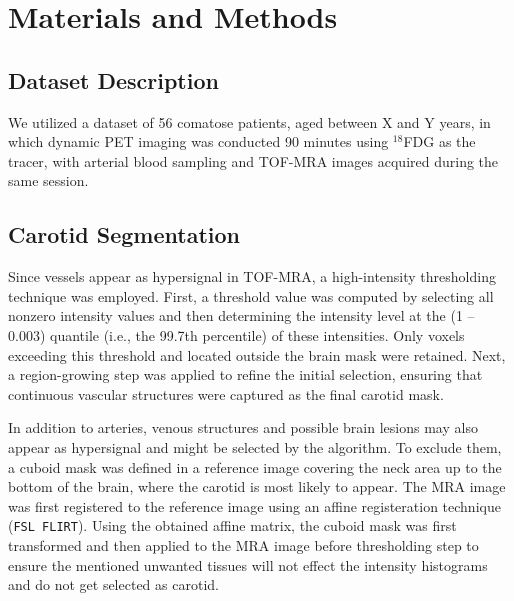 \chapter{Materials and Methods}

\section{Dataset Description}
We utilized a dataset of 56 comatose patients, aged between  X and Y years, in which dynamic PET imaging was conducted 90 minutes using \(^{18}\)FDG as the tracer, with arterial blood sampling and TOF-MRA images acquired during the same session.
\section{Carotid Segmentation\label{sec:carotid}}
Since vessels appear as hypersignal in TOF-MRA, a high-intensity thresholding technique was employed.
First, a threshold value was computed by selecting all nonzero intensity values and then determining the intensity level at the (1 – 0.003) quantile (i.e., the 99.7th percentile) of these intensities.
Only voxels exceeding this threshold and located outside the brain mask were retained.
Next, a region-growing step was applied to refine the initial selection, ensuring that continuous vascular structures were captured as the final carotid mask.

In addition to arteries, venous structures and possible brain lesions may also appear as hypersignal and might be selected by the algorithm.
To exclude them, a cuboid mask was defined in a reference image covering the neck area up to the bottom of the brain, where the carotid is most likely to appear.
The MRA image was first registered to the reference image using an affine registeration technique (\texttt{\small FSL FLIRT}).
Using the obtained affine matrix, the cuboid mask was first transformed and then applied to the MRA image before thresholding step to ensure the mentioned unwanted tissues will not effect the intensity histograms and do not get selected as carotid.


